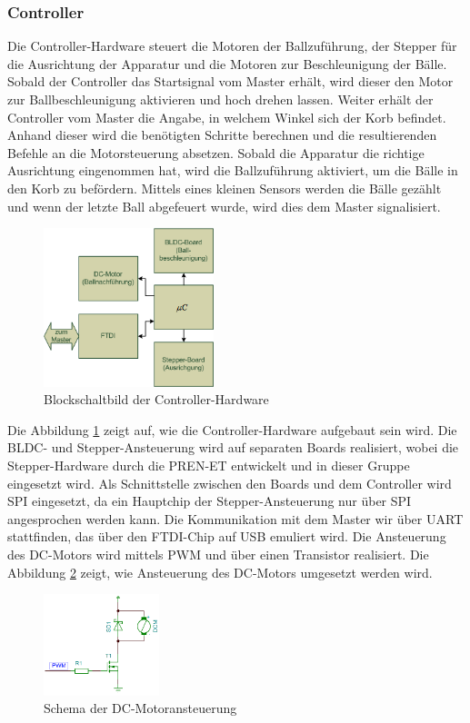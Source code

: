\subsubsection{Controller}
	Die Controller-Hardware steuert die Motoren der Ballzuführung, der Stepper für die Ausrichtung der Apparatur und die Motoren zur Beschleunigung der Bälle. Sobald der Controller das Startsignal vom Master erhält, wird dieser den Motor zur Ballbeschleunigung aktivieren und hoch drehen lassen. Weiter erhält der Controller vom Master die Angabe, in welchem Winkel sich der Korb befindet. Anhand dieser wird die benötigten Schritte berechnen und die resultierenden Befehle an die Motorsteuerung absetzen. Sobald die Apparatur die richtige Ausrichtung eingenommen hat, wird die Ballzuführung aktiviert, um die Bälle in den Korb zu befördern. Mittels eines kleinen Sensors werden die Bälle gezählt und wenn der letzte Ball abgefeuert wurde, wird dies dem Master signalisiert.\\
	\begin{figure}
		\centering
		\includegraphics[width=0.44\textwidth]{Enddokumentation/Loesungskonzept/Bilder/Blockschaltbild_Controller.png}
		\caption{Blockschaltbild der Controller-Hardware}
		\label{fig:Blockschaltbild_Controller}
	\end{figure}
	Die Abbildung \ref{fig:Blockschaltbild_Controller} zeigt auf, wie die Controller-Hardware aufgebaut sein wird. Die BLDC- und Stepper-Ansteuerung wird auf separaten Boards realisiert, wobei die Stepper-Hardware durch die PREN-ET
	entwickelt und in dieser Gruppe eingesetzt wird. Als Schnittstelle zwischen den Boards und dem Controller wird SPI eingesetzt, da ein Hauptchip der Stepper-Ansteuerung nur über SPI angesprochen werden kann. Die Kommunikation mit dem Master wir über UART stattfinden, das über den FTDI-Chip auf USB emuliert wird. Die Ansteuerung des DC-Motors wird mittels PWM und über einen Transistor realisiert. Die Abbildung \ref{fig:Schema_DC-Motor} zeigt, wie Ansteuerung des DC-Motors umgesetzt werden wird.
	\begin{figure}[h!] %
		\centering
		\includegraphics[width=0.3\textwidth]{Enddokumentation/Loesungskonzept/Bilder/SchemaDcMotor.png}
		\caption{Schema der DC-Motoransteuerung}
		\label{fig:Schema_DC-Motor}
	\end{figure}